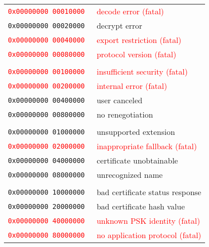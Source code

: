 \documentclass[documentation]{subfiles}
\begin{document}
\begin{minipage}{.48\textwidth}
\begin{longtable}{>{\tt}rl}
        \\
        \textcolor{red}   {0x00000000 00010000} & \textcolor{red}{decode error (fatal)}\\
                           0x00000000 00020000  & decrypt error\\
        \textcolor{red}   {0x00000000 00040000} & \textcolor{red}{export restriction (fatal)}\\
        \textcolor{red}   {0x00000000 00080000} & \textcolor{red}{protocol version (fatal)}\\
        \\
        \textcolor{red}   {0x00000000 00100000} & \textcolor{red}{insufficient security (fatal)}\\
        \textcolor{red}   {0x00000000 00200000} & \textcolor{red}{internal error (fatal)}\\
                           0x00000000 00400000  & user canceled\\
                           0x00000000 00800000  & no renegotiation\\
        \\
                           0x00000000 01000000  & unsupported extension\\
        \textcolor{red}   {0x00000000 02000000} & \textcolor{red}{inappropriate fallback (fatal)}\\
                           0x00000000 04000000  & certificate unobtainable\\
                           0x00000000 08000000  & unrecognized name\\
        \\
                           0x00000000 10000000  & bad certificate status response\\
                           0x00000000 20000000  & bad certificate hash value\\
        \textcolor{red}   {0x00000000 40000000} & \textcolor{red}{unknown PSK identity (fatal)}\\
        \textcolor{red}   {0x00000000 80000000} & \textcolor{red}{no application protocol (fatal)}\\
        \bottomrule
    \end{longtable}
\end{minipage}%
\hfill
\end{document}
